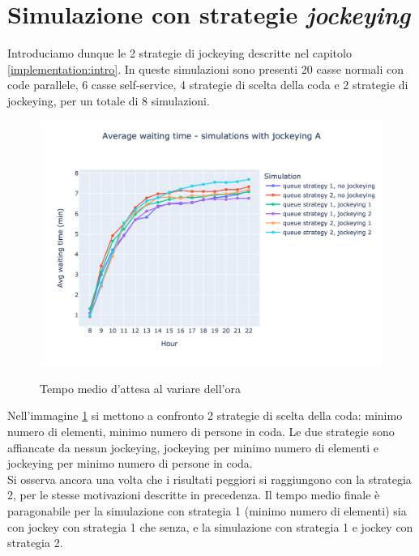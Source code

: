 \section{Simulazione con strategie \textit{jockeying}}

Introduciamo dunque le 2 strategie di jockeying descritte nel capitolo
\ref{implementation:intro}. In queste simulazioni sono presenti 20
casse normali con code parallele, 6 casse self-service, 4 strategie di
scelta della coda e 2 strategie di jockeying, per un totale di 8
simulazioni.

\begin{figure}[H]
	\centering
	\includegraphics[width=12cm]{"images/results/avg_wt_jockey_a.png"}
	\label{fig:avg_wt_jockey_a}
	\caption{Tempo medio d'attesa al variare dell'ora}
\end{figure}

Nell'immagine \ref{fig:avg_wt_jockey_a} si mettono a confronto 2 strategie di scelta della coda: minimo numero di elementi, minimo numero di persone in coda. Le due strategie sono affiancate da nessun jockeying, jockeying per minimo numero di elementi e jockeying per minimo numero di persone in coda. \\
Si osserva ancora una volta che i risultati peggiori si raggiungono
con la strategia 2, per le stesse motivazioni descritte in
precedenza. Il tempo medio finale è paragonabile per la simulazione
con strategia 1 (minimo numero di elementi) sia con jockey con
strategia 1 che senza, e la simulazione con strategia 1 e jockey con
strategia 2.

